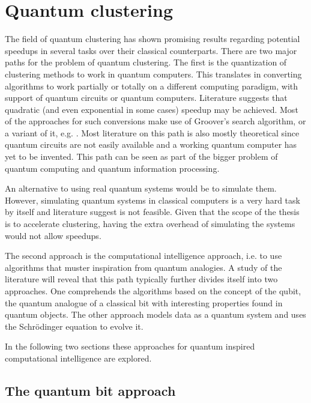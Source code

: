 \section{Quantum clustering}
\label{sec:quantum clustering}
The field of quantum clustering has shown promising results regarding potential speedups in several tasks over their classical counterparts. 
There are two major paths for the problem of quantum clustering. The first is the quantization of clustering methods to work in quantum computers. This translates in converting algorithms to work partially or totally on a different computing paradigm, with support of quantum circuits or quantum computers. Literature suggests that quadratic (and even exponential in some cases) speedup may be achieved. Most of the approaches for such conversions make use of Groover's search algorithm, or a variant of it, e.g. \citet{Wiebe2014}. Most literature on this path is also mostly theoretical since quantum circuits are not easily available and a working quantum computer has yet to be invented. This path can be seen as part of the bigger problem of quantum computing and quantum information processing.


An alternative to using real quantum systems would be to simulate them. However, simulating quantum systems in classical computers is a very hard task by itself and literature suggest is not feasible. Given that the scope of the thesis is to accelerate clustering, having the extra overhead of simulating the systems would not allow speedups.

The second approach is the computational intelligence approach, i.e.  to use algorithms that muster inspiration from quantum analogies. A study of the literature will reveal that this path typically further divides itself into two approaches. One comprehends the algorithms based on the concept of the qubit, the quantum analogue of a classical bit with interesting properties found in quantum objects. The other approach models data as a quantum system and uses the Schrödinger equation to evolve it.

In the following two sections these approaches for quantum inspired computational intelligence are explored.

\subsection{The quantum bit approach}
\label{sec:qubit}

